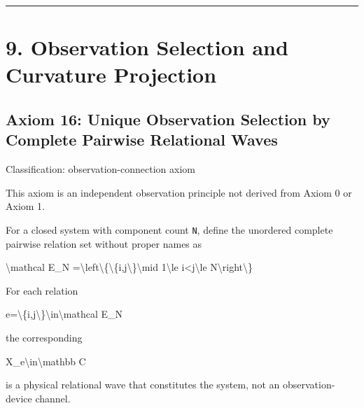 \documentclass[
  a4paper,
]{article}
\newenvironment{Shaded}{}{}
\newcommand{\NormalTok}[1]{#1}
\begin{document}
\begin{center}\rule{0.5\linewidth}{0.5pt}\end{center}

\section{9. Observation Selection and Curvature
Projection}\label{observation-selection-and-curvature-projection}

\subsection{Axiom 16: Unique Observation Selection by Complete Pairwise
Relational
Waves}\label{axiom-16-unique-observation-selection-by-complete-pairwise-relational-waves}

Classification: observation-connection axiom

This axiom is an independent observation principle not derived from
Axiom 0 or Axiom 1.

For a closed system with component count \texttt{N}, define the
unordered complete pairwise relation set without proper names as

\begin{Shaded}
\begin{Highlighting}[]
\NormalTok{\textbackslash{}mathcal E\_N}
\NormalTok{=\textbackslash{}left\textbackslash{}\{\textbackslash{}\{i,j\textbackslash{}\}\textbackslash{}mid 1\textbackslash{}le i\textless{}j\textbackslash{}le N\textbackslash{}right\textbackslash{}\}}
\end{Highlighting}
\end{Shaded}

For each relation

\begin{Shaded}
\begin{Highlighting}[]
\NormalTok{e=\textbackslash{}\{i,j\textbackslash{}\}\textbackslash{}in\textbackslash{}mathcal E\_N}
\end{Highlighting}
\end{Shaded}

the corresponding

\begin{Shaded}
\begin{Highlighting}[]
\NormalTok{X\_e\textbackslash{}in\textbackslash{}mathbb C}
\end{Highlighting}
\end{Shaded}

is a physical relational wave that constitutes the system, not an
observation-device channel.
\end{document}
